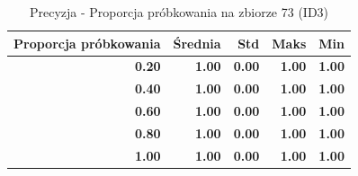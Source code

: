 \begin{table}[htbp]
\centering
\small
\setlength{\tabcolsep}{6pt}
\renewcommand{\arraystretch}{1.2}
\caption{Precyzja - Proporcja próbkowania na zbiorze 73 (ID3)}
\label{tab:ID3_sample_ratio_73_precision}
\begin{tabular}{r|r|r|r|r}
\toprule
Proporcja próbkowania & Średnia & Std & Maks & Min \\
\hline
\textbf{0.20} & \textbf{1.00} & \textbf{0.00} & \textbf{1.00} & \textbf{1.00} \\
\textbf{0.40} & \textbf{1.00} & \textbf{0.00} & \textbf{1.00} & \textbf{1.00} \\
\textbf{0.60} & \textbf{1.00} & \textbf{0.00} & \textbf{1.00} & \textbf{1.00} \\
\textbf{0.80} & \textbf{1.00} & \textbf{0.00} & \textbf{1.00} & \textbf{1.00} \\
\textbf{1.00} & \textbf{1.00} & \textbf{0.00} & \textbf{1.00} & \textbf{1.00} \\
\bottomrule
\end{tabular}
\end{table}